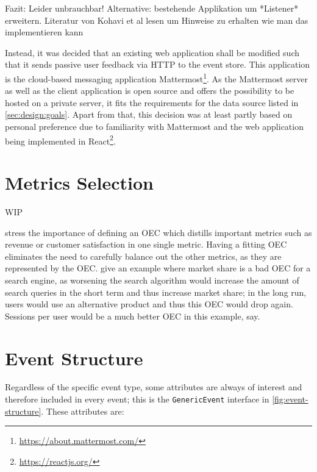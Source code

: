 Fazit: Leider unbrauchbar!
Alternative: bestehende Applikation um *Listener* erweitern. Literatur von Kohavi et al lesen um Hinweise zu erhalten wie man das implementieren kann

Instead, it was decided that an existing web application shall be modified such that it sends passive user feedback via \ac{HTTP} to the event store.
This application is the cloud-based messaging application Mattermost\footnote{\url{https://about.mattermost.com/}}.
As the Mattermost server as well as the client application is open source and offers the possibility to be hosted on a private server, it fits the requirements for the data source listed in \cref{sec:design:goals}.
Apart from that, this decision was at least partly based on personal preference due to familiarity with Mattermost and the web application being implemented in React\footnote{\url{https://reactjs.org/}}.

\section{Metrics Selection}
\label{sec:design:metrics}

WIP
\cite{Kelly:2003:IFI:959258.959260}
\cite{Claypool2001}


\citet{Kohavi2013a} stress the importance of defining an \ac{OEC} which distills important metrics such as revenue or customer satisfaction in one single metric.
Having a fitting \ac{OEC} eliminates the need to carefully balance out the other metrics, as they are represented by the \ac{OEC}.
\citeauthor{Kohavi2013a} give an example where market share is a bad \ac{OEC} for a search engine, as worsening the search algorithm would increase the amount of search queries in the short term and thus increase market share; in the long run, users would use an alternative product and thus this \ac{OEC} would drop again.
Sessions per user would be a much better \ac{OEC} in this example, \citeauthor{Kohavi2013a} say.


\section{Event Structure}
\label{sec:design:event-structure}

Regardless of the specific event type, some attributes are always of interest and therefore included in every event; this is the \texttt{GenericEvent} interface in \cref{fig:event-structure}.
These attributes are:

